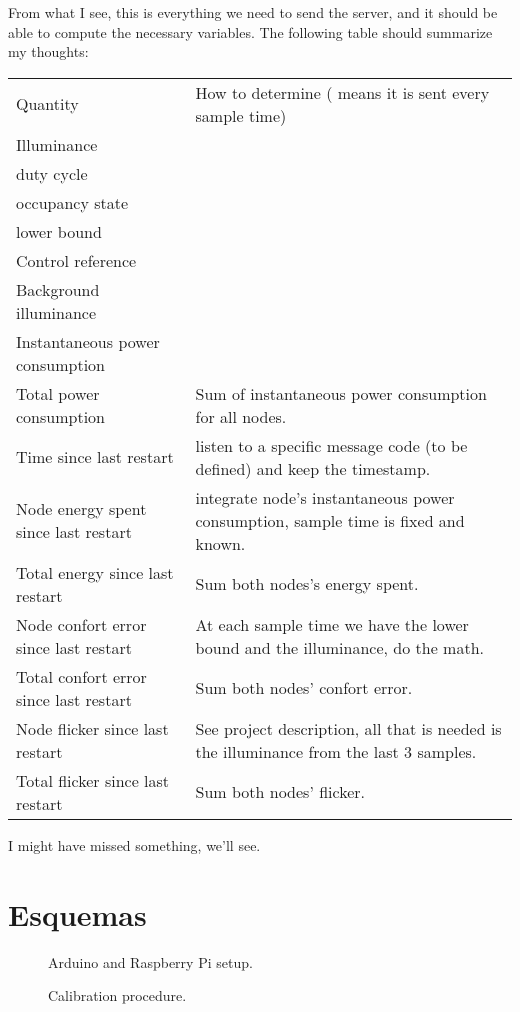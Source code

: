 \documentclass[english,palatino]{ist-report}
\begin{document}
From what I see, this is everything we need to send the server, and it should be able to compute the necessary variables. The following table should summarize my thoughts:
\begin{table}[h]
	\centering
	\begin{tabularx}{\linewidth}{l|X}
		Quantity & How to determine (\ccheckmark{} means it is sent every sample time) \\
		Illuminance & \ccheckmark{} \\
		duty cycle  & \ccheckmark{} \\
		occupancy state & \ccheckmark{} \\
		lower bound & \ccheckmark{} \\
		Control reference & \ccheckmark{} \\
		Background illuminance & \ccheckmark{} \\
		Instantaneous power consumption & \ccheckmark{} \\
		Total power consumption & Sum of instantaneous power consumption for all nodes. \\
		Time since last restart & listen to a specific message code (to be defined) and keep the timestamp. \\
		Node energy spent since last restart & integrate node's instantaneous power consumption, sample time is fixed and known. \\
		Total energy since last restart & Sum both nodes's energy spent. \\
		Node confort error since last restart & At each sample time we have the lower bound and the illuminance, do the math. \\
		Total confort error since last restart & Sum both nodes' confort error. \\
		Node flicker since last restart & See project description, all that is needed is the illuminance from the last 3 samples. \\
		Total flicker since last restart & Sum both nodes' flicker.
	\end{tabularx}
\end{table}

I might have missed something, we'll see.

\appendix
\section{Esquemas}

\begin{figure}[ht]
	\centering
	
	\caption{Arduino and Raspberry Pi setup.}
\end{figure}

\begin{figure}[ht]
	\centering
	
	\caption{Calibration procedure.}
	\label{fig:calib}
\end{figure}

\pagebreak
\printbibliography

\listoftodos
\end{document}
